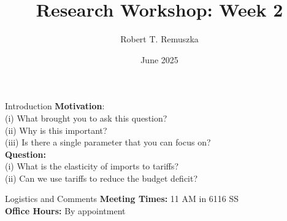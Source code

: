 \documentclass[11pt, aspectratio=169]{beamer}                  %
\title{Research Workshop: Week 2}
\author{Robert T. Remuszka}
\date{June 2025}
\begin{document}
\maketitle
\begin{frame}{Introduction}
    \label{frame:intro}
    \textcolor{mycolor}{\textbf{Motivation}}:\\
    \textcolor{mycolor}{(i)} What brought you to ask this question?\\
    \textcolor{mycolor}{(ii)} Why is this important?\\
    \textcolor{mycolor}{(iii)} Is there a single parameter that you can focus on?\\
    \vspace{1em}
    \textcolor{mycolor}{\textbf{Question:}}\\
    \textcolor{mycolor}{(i)} What is the elasticity of imports to tariffs?\\
    \textcolor{mycolor}{(ii)} Can we use tariffs to reduce the budget deficit?
\end{frame}
\begin{frame}{Logistics and Comments}
    \textcolor{mycolor}{\textbf{Meeting Times:}} 11 AM in 6116 SS\\
    \vspace{1em}
    \textcolor{mycolor}{\textbf{Office Hours:}} By appointment
\end{frame}
\end{document}
